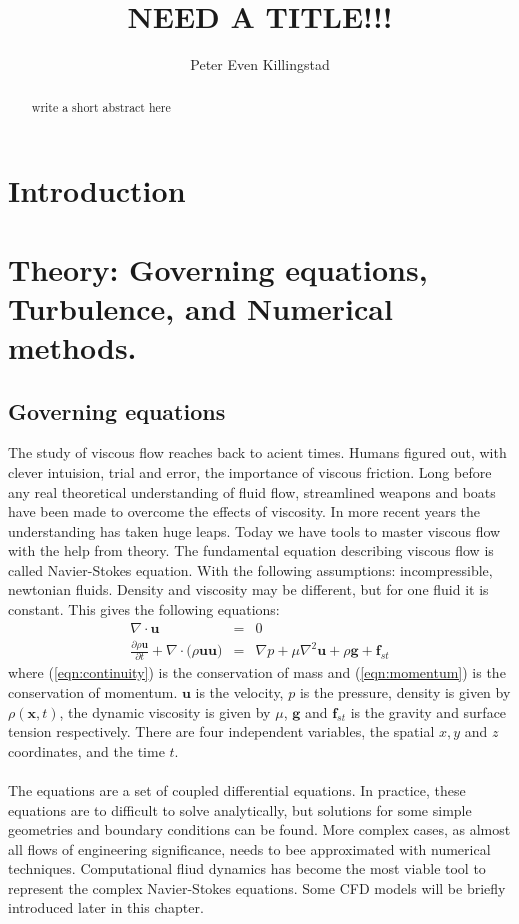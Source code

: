 \documentclass[a4paper, 12pt]{report}
\title{NEED A TITLE!!!}
\author{Peter Even Killingstad}
\begin{document}
\masterfrontpage
\begin{abstract}
 write a short abstract here
\end{abstract}
\tableofcontents

\chapter{Introduction}
\chapter{Theory: Governing equations, Turbulence, and Numerical methods.}
\section{Governing equations}
The study of viscous flow reaches back to acient times. Humans figured out, with clever intuision, trial and error, the importance of viscous friction. Long before any real theoretical understanding of fluid flow, streamlined weapons and boats have been made to overcome the effects of viscosity. In more recent years the understanding has taken huge leaps. Today we have tools to master viscous flow with the help from theory. The fundamental equation describing viscous flow is called Navier-Stokes equation\cite{White}. With the following assumptions: incompressible, newtonian fluids. Density and viscosity may be different, but for one fluid it is constant. This gives the following equations:
\begin{eqnarray}
\label{eqn:continuity}
\nabla \cdot \mathbf{u} &=& 0 \\ 
\label{eqn:momentum}
\frac{\partial \rho \mathbf{u}}{\partial t} + \nabla \cdot \big(\rho \mathbf{u} \mathbf{u}\big) &=& \nabla p + \mu \nabla^2 \mathbf{u} + \rho\mathbf{g} + \mathbf{f}_{st} 
\end{eqnarray}
where (\ref{eqn:continuity}) is the conservation of mass and (\ref{eqn:momentum}) is the conservation of momentum. $\mathbf{u}$ is the velocity, $p$ is the pressure, density is given by $\rho(\mathbf{x},t)$, the dynamic viscosity is given by $\mu$, $\mathbf{g}$ and $\mathbf{f}_{st}$ is the gravity and surface tension respectively. There are four independent variables, the spatial $x, y$ and $z$ coordinates, and the time $t$.\\
\\
The equations are a set of coupled differential equations. In practice, these equations are to difficult to solve analytically, but solutions for some simple geometries and boundary conditions can be found. More complex cases, as almost all flows of engineering significance, needs to bee approximated with numerical techniques. Computational fliud dynamics has become the most viable tool to represent the complex Navier-Stokes equations. Some CFD models will be briefly introduced later in this chapter.\\
\end{document}
